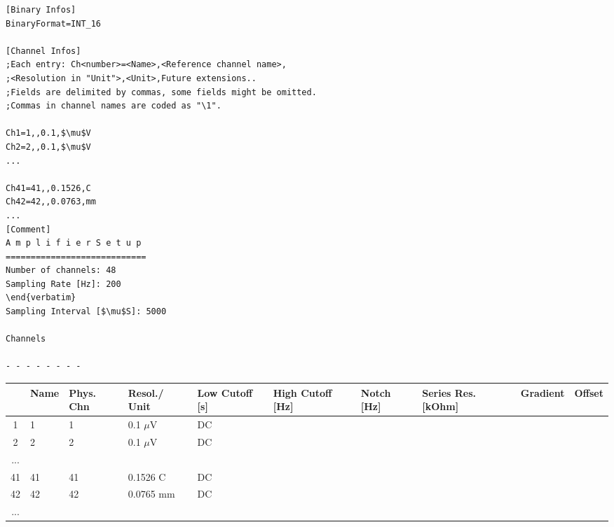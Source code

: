 \documentclass{diplomka}
\begin{document}
\begin{lstlisting}[frame=single,caption={The header file example - Information about format and channels and the amplifier setup.},label=HeaderFile3]
[Binary Infos]
BinaryFormat=INT_16

[Channel Infos]
;Each entry: Ch<number>=<Name>,<Reference channel name>,
;<Resolution in "Unit">,<Unit>,Future extensions..
;Fields are delimited by commas, some fields might be omitted.
;Commas in channel names are coded as "\1".

Ch1=1,,0.1,$\mu$V
Ch2=2,,0.1,$\mu$V
...

Ch41=41,,0.1526,C
Ch42=42,,0.0763,mm
...
[Comment]
A m p l i f i e r S e t u p
============================
Number of channels: 48
Sampling Rate [Hz]: 200
\end{verbatim}
Sampling Interval [$\mu$S]: 5000

Channels

- - - - - - - -
\end{lstlisting}
\resizebox{14cm}{!} {
	\begin{tabular}{|c|p{1.5cm}|p{1.5cm}|p{2cm}|p{1.5cm}|p{1.5cm}|p{1.5cm}|p{1.5cm}|p{1.5cm}|p{1.5cm}|}
		\hline & Name & Phys. Chn & Resol./ Unit & Low Cutoff [s] & High Cutoff [Hz] & Notch [Hz] & Series Res. [kOhm] & Gradient & Offset \\ 
		\hline 1 & 1 & 1 & 0.1 $\mu$V & DC &  &  &  &  &  \\ 
		\hline 2 & 2 & 2 & 0.1 $\mu$V & DC &  &  &  &  &  \\ 
		\hline ... &  &  &  &  &  &  &  &  &  \\ 
		\hline 41 & 41 & 41 & 0.1526 C & DC &  &  &  &  &  \\ 
		\hline 42 & 42 & 42 & 0.0765 mm & DC &  &  &  &  &  \\ 
		\hline ... &  &  &  &  &  &  &  &  &  \\ 
		\hline 
		\end{tabular} 
		\label{HeaderFile4}		
		}
		
\end{document}
